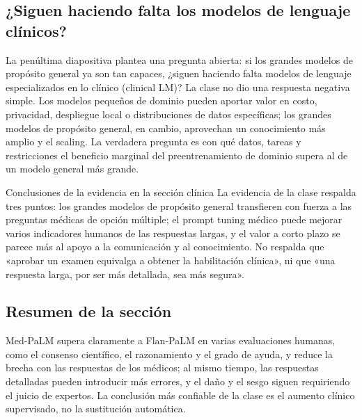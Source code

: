 \subsection{¿Siguen haciendo falta los modelos de lenguaje clínicos?}

La penúltima diapositiva plantea una pregunta abierta: si los grandes modelos de propósito general ya son tan capaces, ¿siguen haciendo falta modelos de lenguaje especializados en lo clínico (clinical LM)? La clase no dio una respuesta negativa simple. Los modelos pequeños de dominio pueden aportar valor en costo, privacidad, despliegue local o distribuciones de datos específicas; los grandes modelos de propósito general, en cambio, aprovechan un conocimiento más amplio y el scaling. La verdadera pregunta es con qué datos, tareas y restricciones el beneficio marginal del preentrenamiento de dominio supera al de un modelo general más grande.




\begin{importantbox}{Conclusiones de la evidencia en la sección clínica}
La evidencia de la clase respalda tres puntos: los grandes modelos de propósito general transfieren con fuerza a las preguntas médicas de opción múltiple; el prompt tuning médico puede mejorar varios indicadores humanos de las respuestas largas, y el valor a corto plazo se parece más al apoyo a la comunicación y al conocimiento. No respalda que «aprobar un examen equivalga a obtener la habilitación clínica», ni que «una respuesta larga, por ser más detallada, sea más segura».
\end{importantbox}

\subsection{Resumen de la sección}

Med-PaLM supera claramente a Flan-PaLM en varias evaluaciones humanas, como el consenso científico, el razonamiento y el grado de ayuda, y reduce la brecha con las respuestas de los médicos; al mismo tiempo, las respuestas detalladas pueden introducir más errores, y el daño y el sesgo siguen requiriendo el juicio de expertos. La conclusión más confiable de la clase es el aumento clínico supervisado, no la sustitución automática.
